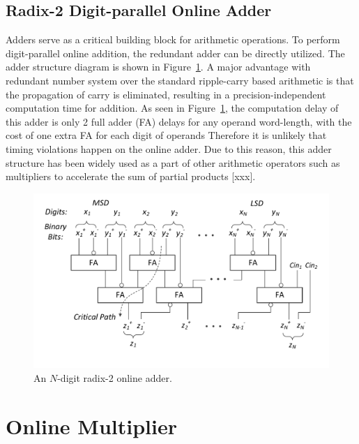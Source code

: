 \documentclass{acm_proc_article-sp}
\begin{document}
\subsection{Radix-2 Digit-parallel Online Adder}
Adders serve as a critical building block for arithmetic operations. To perform digit-parallel online addition, the redundant adder can be directly utilized. The adder structure diagram is shown in Figure~\ref{Fig:Radix2SD_adder}. A major advantage with redundant number system over the standard ripple-carry based arithmetic is that the propagation of carry is eliminated, resulting in a precision-independent computation time for addition. As seen in Figure~\ref{Fig:Radix2SD_adder}, the computation delay of this adder is only 2 full adder (FA) delays for any operand word-length, with the cost of one extra FA for each digit of operands Therefore it is unlikely that timing violations happen on the online adder. Due to this reason, this adder structure has been widely used as a part of other arithmetic operators such as multipliers to accelerate the sum of partial products [xxx].
%
\begin{figure}
\includegraphics[width=.5\textwidth]{./Figures/SDAdder.pdf}
\vspace{-6.5ex}
\caption{An $N$-digit radix-2 online adder.}
\label{Fig:Radix2SD_adder}
\end{figure}


\section{Online Multiplier}
\end{document}
